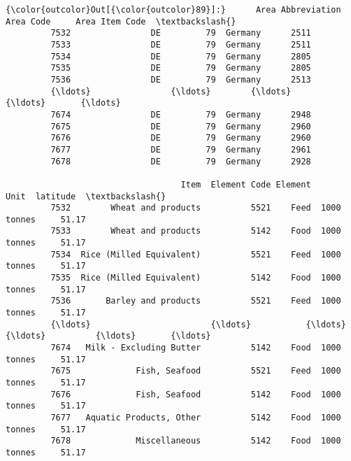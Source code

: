 \documentclass[11pt]{article}
\begin{document}
\begin{Verbatim}[commandchars=\\\{\}]
{\color{outcolor}Out[{\color{outcolor}89}]:}      Area Abbreviation  Area Code     Area Item Code  \textbackslash{}
         7532                DE         79  Germany      2511   
         7533                DE         79  Germany      2511   
         7534                DE         79  Germany      2805   
         7535                DE         79  Germany      2805   
         7536                DE         79  Germany      2513   
         {\ldots}                {\ldots}        {\ldots}      {\ldots}       {\ldots}   
         7674                DE         79  Germany      2948   
         7675                DE         79  Germany      2960   
         7676                DE         79  Germany      2960   
         7677                DE         79  Germany      2961   
         7678                DE         79  Germany      2928   
         
                                   Item  Element Code Element         Unit  latitude  \textbackslash{}
         7532        Wheat and products          5521    Feed  1000 tonnes     51.17   
         7533        Wheat and products          5142    Food  1000 tonnes     51.17   
         7534  Rice (Milled Equivalent)          5521    Feed  1000 tonnes     51.17   
         7535  Rice (Milled Equivalent)          5142    Food  1000 tonnes     51.17   
         7536       Barley and products          5521    Feed  1000 tonnes     51.17   
         {\ldots}                        {\ldots}           {\ldots}     {\ldots}          {\ldots}       {\ldots}   
         7674   Milk - Excluding Butter          5142    Food  1000 tonnes     51.17   
         7675             Fish, Seafood          5521    Feed  1000 tonnes     51.17   
         7676             Fish, Seafood          5142    Food  1000 tonnes     51.17   
         7677   Aquatic Products, Other          5142    Food  1000 tonnes     51.17   
         7678             Miscellaneous          5142    Food  1000 tonnes     51.17   
         

\end{Verbatim}
\end{document}
